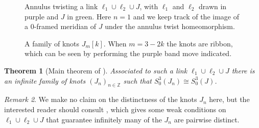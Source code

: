 \documentclass [11pt]{amsart}
\newtheorem {theorem}{Theorem}[section]
\theoremstyle{remark}
\newtheorem {remark}[theorem]{Remark}
\def\Z {{\mathbb{Z}}}
\begin{document}
\begin{figure}
{
   \fontsize{9pt}{11pt}\selectfont
   \def\svgwidth{6in}
   
\vspace*{3mm}
}
\caption{Annulus twisting a link $\ell_1\cup\ell_2\cup J$, with $\ell_1$ and $\ell_2$ drawn in purple and $J$ in green. Here $n=1$ and we keep track of the image of a 0-framed meridian of $J$ under the annulus twist homeomorphism.} 
\label{fig:annulustwist}
\end{figure}


\begin{figure}
{
   \fontsize{10pt}{12pt}\selectfont
   \def\svgwidth{2.3in}
  
}
\caption{A family of knots $J_m[k]$.  When $m=3-2k$ the knots are ribbon, which can be seen by performing the purple band move indicated.}
\label{fig:Jmk}
\end{figure}


\begin{theorem}[Main theorem of \cite{Osoinach}]\label{thm:annulus}
Associated to such a link $\ell_1\cup\ell_2\cup J$ there is an infinite family of knots $(J_n)_{n \in \Z}$ such that $S^3_0(J_n)\cong S^3_0(J)$.
\end{theorem}
\begin{remark}
We make no claim on the distinctness of the knots $J_n$ here, but the interested reader should consult \cite{BGL}, which gives some weak conditions on $\ell_1\cup\ell_2\cup J$ that guarantee infinitely many of the $J_n$ are pairwise distinct. 
\end{remark}
\end{document}

